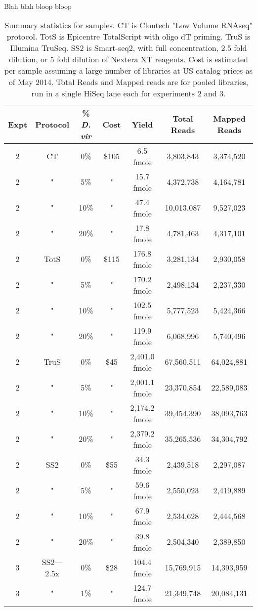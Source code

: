 Blah blah bloop bloop

\begin{table}[htdp]
\caption{Summary statistics for samples. CT is Clontech "Low Volume RNAseq" protocol. TotS is Epicentre TotalScript with oligo dT priming. TruS is Illumina TruSeq. SS2 is Smart-seq2, with full concentration, 2.5 fold dilution, or 5 fold dilution of Nextera XT reagents. Cost is estimated per sample assuming a
     large number of libraries at US catalog prices as of May 2014. Total Reads
     and Mapped reads are for pooled libraries, run in a single HiSeq lane each
     for experiments 2 and 3. }
\begin{center}
\begin{tabular}{|c|c|c|c|c|c|c|} \hline
      Expt & Protocol & \% {\em D. vir} & Cost &  Yield & Total Reads & Mapped Reads \\\hline 
2 & CT & 0\% & \$105 & 6.5 fmole & 3,803,843 &3,374,520 \\
2 & " & 5\% & " & 15.7 fmole & 4,372,738 &4,164,781 \\
2 & " & 10\% & " & 47.4 fmole & 10,013,087 &9,527,023 \\
2 & " & 20\% & " & 17.8 fmole & 4,781,463 &4,317,101 \\
2 & TotS & 0\% & \$115 & 176.8 fmole & 3,281,134 &2,930,058 \\
2 & " & 5\% & " & 170.2 fmole & 2,498,134 &2,237,330 \\
2 & " & 10\% & " & 102.5 fmole & 5,777,523 &5,424,366 \\
2 & " & 20\% & " & 119.9 fmole & 6,068,996 &5,740,496 \\
2 & TruS & 0\% & \$45 & 2,401.0 fmole & 67,560,511 &64,024,881 \\
2 & " & 5\% & " & 2,001.1 fmole & 23,370,854 &22,589,083 \\
2 & " & 10\% & " & 2,174.2 fmole & 39,454,390 &38,093,763 \\
2 & " & 20\% & " & 2,379.2 fmole & 35,265,536 &34,304,792 \\
2 & SS2 & 0\% & \$55 & 34.3 fmole & 2,439,518 &2,297,087 \\
2 & " & 5\% & " & 59.6 fmole & 2,550,023 &2,419,889 \\
2 & " & 10\% & " & 67.9 fmole & 2,534,628 &2,444,568 \\
2 & " & 20\% & " & 39.8 fmole & 2,504,340 &2,389,850 \\
3 & SS2---2.5x & 0\% & \$28 & 104.4 fmole & 15,769,915 &14,393,959 \\
3 & " & 1\% & " & 124.7 fmole & 21,349,748 &20,084,131 \\

\end{tabular}
\end{center}
\end{table}
